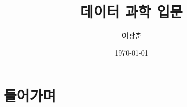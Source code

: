 \documentclass[a4paper]{article}
\title{데이터 과학 입문}
\author{이광춘}
\date{\today}
\begin{document}
	
	\begin{titlepage}
		\maketitle
	\end{titlepage}

	\section{들어가며}
	\jiwon
	
\end{document}
